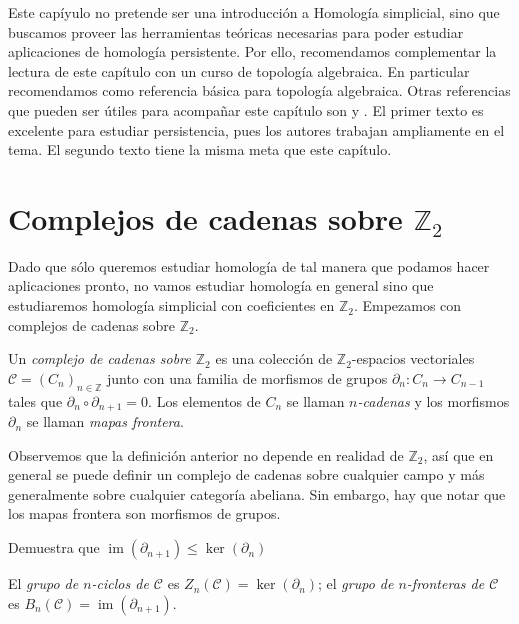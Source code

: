 \documentclass{standalone}
\begin{document}
	Este capíyulo no pretende ser una introducción a Homología simplicial, sino que buscamos proveer las herramientas teóricas necesarias para poder estudiar aplicaciones de homología persistente. Por ello, recomendamos complementar la lectura de este capítulo con un curso de topología algebraica. En particular recomendamos \cite{munkres:1984:algebraic:topology} como referencia básica para topología algebraica. Otras referencias que pueden ser útiles para acompañar este capítulo son \cite[Capítulos IV y VII]{edelsbrunner:2010:computational} y \cite{scoville:2019:discrete:morse}. El primer texto es excelente para estudiar persistencia, pues los autores trabajan ampliamente en el tema. El segundo texto tiene la misma meta que este capítulo. 
	
	\section{Complejos de cadenas sobre $\mathbb{Z}_{2}$}
	
	Dado que sólo queremos estudiar homología de tal manera que podamos hacer aplicaciones pronto, no vamos estudiar homología en general sino que estudiaremos homología simplicial con coeficientes en $\mathbb{Z}_{2}$. Empezamos con complejos de cadenas sobre $\mathbb{Z}_{2}$.
	
	\begin{definition}\label{def:chain_complex_z_2}
		Un \emph{complejo de cadenas sobre $\mathbb{Z}_{2}$} es una colección de $\mathbb{Z}_{2}$-espacios vectoriales $\mathcal{C}=(C_{n})_{n\in\mathbb{Z}}$ junto con una familia de morfismos de grupos $\partial_{n}\colon C_{n}\rightarrow C_{n-1}$ tales que $\partial_{n}\circ\partial_{n+1}=0$. Los elementos de $C_{n}$ se llaman \emph{$n$-cadenas} y los morfismos $\partial_{n}$ se llaman \emph{mapas frontera}.
	\end{definition}
	
	Observemos que la definición anterior no depende en realidad de $\mathbb{Z}_{2}$, así que en general se puede definir un complejo de cadenas sobre cualquier campo y más generalmente sobre cualquier categoría abeliana. Sin embargo, hay que notar que los mapas frontera son morfismos de grupos.
	
	\begin{exercise}\label{prop:partial_partial}
		Demuestra que $\operatorname{im}(\partial_{n+1})\leq\operatorname{ker}(\partial_{n})$
	\end{exercise}
	
	\begin{definition}\label{defn:z_cycles_boundary}
		El \emph{grupo de $n$-ciclos de $\mathcal{C}$} es $Z_{n}(\mathcal{C})=\ker(\partial_{n})$; el \emph{grupo de $n$-fronteras de $\mathcal{C}$} es $B_{n}(\mathcal{C})=\operatorname{im}(\partial_{n+1})$.
	\end{definition}
	
\end{document}

